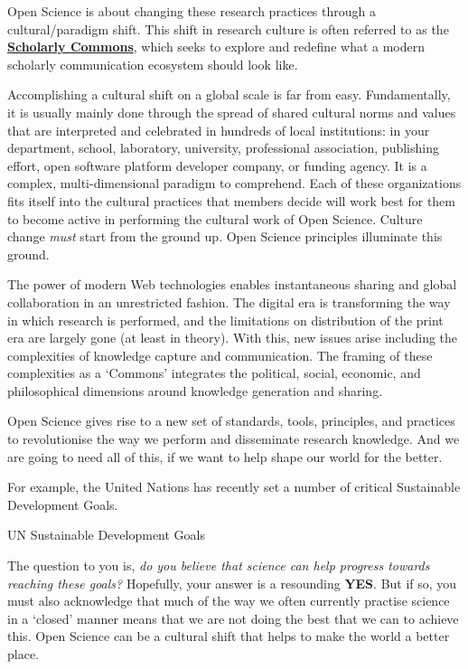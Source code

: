 \documentclass[]{book}
\begin{document}
Open Science is about changing these research practices through a cultural/paradigm shift. This shift in research culture is often referred to as the \href{https://www.force11.org/group/scholarly-commons-working-group}{\textbf{Scholarly Commons}}, which seeks to explore and redefine what a modern scholarly communication ecosystem should look like.

Accomplishing a cultural shift on a global scale is far from easy. Fundamentally, it is usually mainly done through the spread of shared cultural norms and values that are interpreted and celebrated in hundreds of local institutions: in your department, school, laboratory, university, professional association, publishing effort, open software platform developer company, or funding agency. It is a complex, multi-dimensional paradigm to comprehend. Each of these organizations fits itself into the cultural practices that members decide will work best for them to become active in performing the cultural work of Open Science. Culture change \emph{must} start from the ground up. Open Science principles illuminate this ground.

The power of modern Web technologies enables instantaneous sharing and global collaboration in an unrestricted fashion. The digital era is transforming the way in which research is performed, and the limitations on distribution of the print era are largely gone (at least in theory). With this, new issues arise including the complexities of knowledge capture and communication. The framing of these complexities as a `Commons' integrates the political, social, economic, and philosophical dimensions around knowledge generation and sharing.

Open Science gives rise to a new set of standards, tools, principles, and practices to revolutionise the way we perform and disseminate research knowledge. And we are going to need all of this, if we want to help shape our world for the better.

For example, the United Nations has recently set a number of critical Sustainable Development Goals.

UN Sustainable Development Goals

The question to you is, \emph{do you believe that science can help progress towards reaching these goals?} Hopefully, your answer is a resounding \textbf{YES}. But if so, you must also acknowledge that much of the way we often currently practise science in a `closed' manner means that we are not doing the best that we can to achieve this. Open Science can be a cultural shift that helps to make the world a better place.
\end{document}
